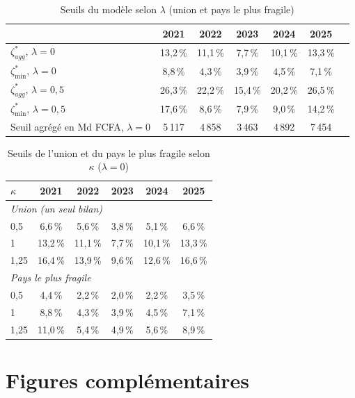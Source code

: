 \documentclass[11pt,a4paper]{article}
\newcommand{\zs}{\zeta^{*}}
\begin{document}
	\begin{table}[htbp]
		\centering
		\caption{Seuils du modèle selon $\lambda$ (union et pays le plus fragile)}\label{tab:seuils-lambda}
		\small
		\begin{tabular}{lcccccc}
			\toprule
			& 2021 & 2022 & 2023 & 2024 & 2025 \\
			\midrule
			$\zs_{agg}$, $\lambda=0$ & 13,2\,\% & 11,1\,\% & 7,7\,\% & 10,1\,\% & 13,3\,\% \\
			$\zs_{\min}$, $\lambda=0$ & 8,8\,\% & 4,3\,\% & 3,9\,\% & 4,5\,\% & 7,1\,\% \\
			$\zs_{agg}$, $\lambda=0{,}5$ & 26,3\,\% & 22,2\,\% & 15,4\,\% & 20,2\,\% & 26,5\,\% \\
			$\zs_{\min}$, $\lambda=0{,}5$ & 17,6\,\% & 8,6\,\% & 7,9\,\% & 9,0\,\% & 14,2\,\% \\
			Seuil agrégé en Md FCFA, $\lambda=0$ & 5\,117 & 4\,858 & 3\,463 & 4\,892 & 7\,454 \\
			\bottomrule
		\end{tabular}
	\end{table}
	
	\begin{table}[htbp]
		\centering
		\caption{Seuils de l'union et du pays le plus fragile selon $\kappa$ ($\lambda=0$)}\label{tab:kappa}
		\small
		\begin{tabular}{lccccc}
			\toprule
			$\kappa$ & 2021 & 2022 & 2023 & 2024 & 2025 \\
			\midrule
			\multicolumn{6}{l}{\emph{Union (un seul bilan)}} \\
			0,5 & 6,6\,\% & 5,6\,\% & 3,8\,\% & 5,1\,\% & 6,6\,\% \\
			1 & 13,2\,\% & 11,1\,\% & 7,7\,\% & 10,1\,\% & 13,3\,\% \\
			1,25 & 16,4\,\% & 13,9\,\% & 9,6\,\% & 12,6\,\% & 16,6\,\% \\
			\multicolumn{6}{l}{\emph{Pays le plus fragile}} \\
			0,5 & 4,4\,\% & 2,2\,\% & 2,0\,\% & 2,2\,\% & 3,5\,\% \\
			1 & 8,8\,\% & 4,3\,\% & 3,9\,\% & 4,5\,\% & 7,1\,\% \\
			1,25 & 11,0\,\% & 5,4\,\% & 4,9\,\% & 5,6\,\% & 8,9\,\% \\
			\bottomrule
		\end{tabular}
	\end{table}
	
	\section{Figures complémentaires}\label{app:figures}
	
\end{document}
